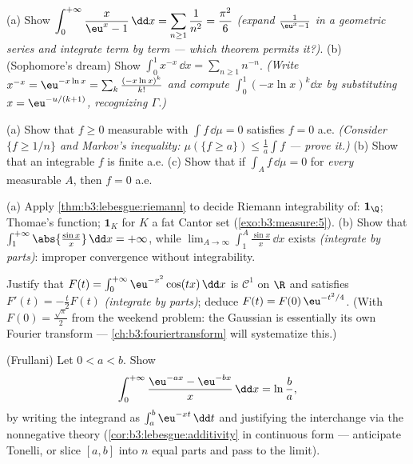 \begin{exercise}[$\star\star$]\label{exo:b3:lebesgue:4}
(a) Show $\displaystyle\int_0^{+\infty}\frac{x}{\eu^x -
1}\,\dd x = \sum_{n\geq1}\frac1{n^2} = \frac{\pi^2}6$
\emph{(expand $\frac1{\eu^x - 1}$ in a geometric series and
integrate term by term --- which theorem permits it?)}.
(b) (Sophomore's dream) Show
$\displaystyle\int_0^1 x^{-x}\,\dd x = \sum_{n\geq1}n^{-n}$.
\emph{(Write $x^{-x} = \eu^{-x\ln x} = \sum_k\frac{(-x\ln
x)^k}{k!}$ and compute $\int_0^1(-x\ln x)^k\dd x$ by
substituting $x = \eu^{-u/(k+1)}$, recognizing $\Gamma$.)}
\end{exercise}

\begin{exercise}[$\star\star$]\label{exo:b3:lebesgue:5}
(a) Show that $f \geq 0$ measurable with $\int f\,\dd\mu = 0$
satisfies $f = 0$ a.e. \emph{(Consider $\{f \geq 1/n\}$ and
Markov's inequality: $\mu(\{f \geq a\}) \leq \frac1a\int f$ ---
prove it.)}
(b) Show that an integrable $f$ is finite a.e.
(c) Show that if $\int_A f\,\dd\mu = 0$ for \emph{every}
measurable $A$, then $f = 0$ a.e.
\end{exercise}

\begin{exercise}[$\star\star$]\label{exo:b3:lebesgue:6}
(a) Apply \cref{thm:b3:lebesgue:riemann} to decide Riemann
integrability of: $\mathbf 1_\Q$; Thomae's function; $\mathbf
1_K$ for $K$ a fat Cantor set (\cref{exo:b3:measure:5}).
(b) Show that $\int_1^{+\infty}\abs{\frac{\sin x}x}\,\dd x =
+\infty$, while $\lim_{A\to\infty}\int_1^A\frac{\sin
x}x\,\dd x$ exists \emph{(integrate by parts)}: improper
convergence without integrability.
\end{exercise}

\begin{exercise}[$\star\star$]\label{exo:b3:lebesgue:7}
Justify that $F(t) = \int_0^{+\infty}\eu^{-x^2}\cos(tx)\,\dd x$
is $\mathcal C^1$ on $\R$ and satisfies $F'(t) = -\frac t2F(t)$
\emph{(integrate by parts)}; deduce $F(t) =
F(0)\,\eu^{-t^2/4}$. (With $F(0) = \frac{\sqrt\pi}2$ from the
weekend problem: the Gaussian is essentially its own Fourier
transform --- \cref{ch:b3:fouriertransform} will systematize
this.)
\end{exercise}

\begin{exercise}[$\star\star\star$]\label{exo:b3:lebesgue:8}
(Frullani) Let $0 < a < b$. Show
\[
\int_0^{+\infty}\frac{\eu^{-ax} - \eu^{-bx}}{x}\,\dd x =
\ln\frac ba,
\]
by writing the integrand as $\int_a^b \eu^{-xt}\,\dd t$ and
justifying the interchange via the nonnegative theory
(\cref{cor:b3:lebesgue:additivity} in continuous form ---
anticipate Tonelli, or slice $[a,b]$ into $n$ equal parts and
pass to the limit).
\end{exercise}

